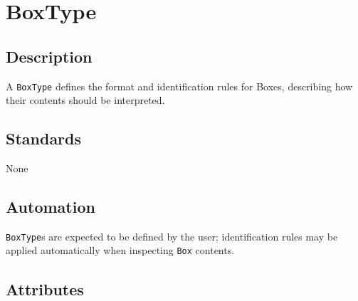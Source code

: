 \documentclass[
]{article}
\begin{document}
\section{BoxType}\label{boxtype}

\subsection{Description}\label{description-5}

A \texttt{BoxType} defines the format and identification rules for
Boxes, describing how their contents should be interpreted.

\subsection{Standards}\label{standards-7}

None

\subsection{Automation}\label{automation-7}

\texttt{BoxType}s are expected to be defined by the user; identification
rules may be applied automatically when inspecting \texttt{Box}
contents.

\subsection{Attributes}\label{attributes-7}
\end{document}
